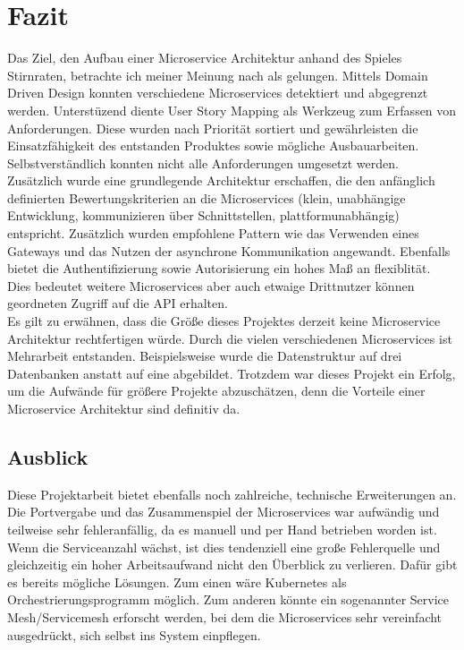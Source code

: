 \section{Fazit}

Das Ziel, den Aufbau einer Microservice Architektur anhand des Spieles Stirnraten, betrachte ich meiner Meinung nach als gelungen. Mittels Domain Driven Design konnten verschiedene Microservices detektiert und abgegrenzt werden. Unterstüzend diente User Story Mapping als Werkzeug zum Erfassen von Anforderungen. Diese wurden nach Priorität sortiert und gewährleisten die Einsatzfähigkeit des entstanden Produktes sowie mögliche Ausbauarbeiten. Selbstverständlich konnten nicht alle Anforderungen umgesetzt werden. \\

Zusätzlich wurde eine grundlegende Architektur erschaffen, die den anfänglich definierten Bewertungskriterien an die Microservices (klein, unabhängige Entwicklung, kommunizieren über Schnittstellen, plattformunabhängig) entspricht. Zusätzlich wurden empfohlene Pattern wie das Verwenden eines Gateways und das Nutzen der asynchrone Kommunikation angewandt. Ebenfalls bietet die Authentifizierung sowie Autorisierung ein hohes Maß an flexiblität. Dies bedeutet weitere Microservices aber auch etwaige Drittnutzer können geordneten Zugriff auf die API erhalten.\\

Es gilt zu erwähnen, dass die Größe dieses Projektes derzeit keine Microservice Architektur rechtfertigen würde. Durch die vielen verschiedenen Microservices ist Mehrarbeit entstanden. Beispielsweise wurde die Datenstruktur auf drei Datenbanken anstatt auf eine abgebildet. Trotzdem war dieses Projekt ein Erfolg, um die Aufwände für größere Projekte abzuschätzen, denn die Vorteile einer Microservice Architektur sind definitiv da.  

\subsection{Ausblick}
Diese Projektarbeit bietet ebenfalls noch zahlreiche, technische Erweiterungen an. Die Portvergabe und das Zusammenspiel der Microservices war aufwändig und teilweise sehr fehleranfällig, da es manuell und per Hand betrieben worden ist. Wenn die Serviceanzahl wächst, ist dies tendenziell eine große Fehlerquelle und gleichzeitig ein hoher Arbeitsaufwand nicht den Überblick zu verlieren. Dafür gibt es bereits mögliche Lösungen. Zum einen wäre Kubernetes als Orchestrierungsprogramm möglich. Zum anderen könnte ein sogenannter Service Mesh/Servicemesh erforscht werden, bei dem die Microservices sehr vereinfacht ausgedrückt, sich selbst ins System einpflegen. \\

